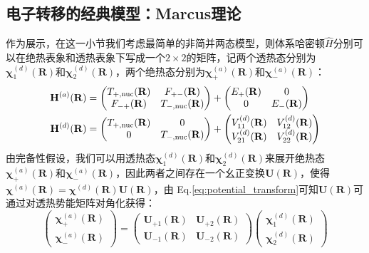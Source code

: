 \subsection{电子转移的经典模型：Marcus理论}
作为展示，在这一小节我们考虑最简单的非简并两态模型，则体系哈密顿$\hat{H}$分别可以在绝热表象和透热表象下写成一个$2 \times 2$的矩阵，记两个透热态分别为$\bm{\chi}^{(d)}_1(\mathbf{R})$和$\bm{\chi}^{(d)}_2(\mathbf{R})$，两个绝热态分别为$\bm{\chi}^{(a)}_+(\mathbf{R})$和$\bm{\chi}^{(a)}_-(\mathbf{R})$：
\[\begin{aligned}
\mathbf{H}^{(a)}(\mathbf{R})&=
\begin{pmatrix}
T_{+,\rm{nuc}}(\mathbf{R}) & F_{+-}(\mathbf{R})\\
F_{-+}(\mathbf{R}) & T_{-,\rm{nuc}}(\mathbf{R})
\end{pmatrix}
+
\begin{pmatrix}
E_+(\mathbf{R}) & 0\\
0 & E_-(\mathbf{R})
\end{pmatrix}\\
\mathbf{H}^{(d)}(\mathbf{R})&=\begin{pmatrix}
T_{+,\rm{nuc}}(\mathbf{R}) & 0\\
0 & T_{-,\rm{nuc}}(\mathbf{R})
\end{pmatrix}
+
\begin{pmatrix}
V_{11}^{(d)}(\mathbf{R}) & V_{12}^{(d)}(\mathbf{R})\\
V_{21}^{(d)}(\mathbf{R}) & V_{22}^{(d)}(\mathbf{R})
\end{pmatrix}
\end{aligned}\]
由完备性假设，我们可以用透热态$\bm{\chi}^{(d)}_1(\mathbf{R})$和$\bm{\chi}^{(d)}_2(\mathbf{R})$来展开绝热态$\bm{\chi}^{(a)}_+(\mathbf{R})$和$\bm{\chi}^{(a)}_-(\mathbf{R})$，因此两者之间存在一个幺正变换$\mathbf{U}(\mathbf{R})$，使得$\bm{\chi}^{(a)}(\mathbf{R})=\bm{\chi}^{(d)}(\mathbf{R})\mathbf{U}(\mathbf{R})$，由 Eq.\eqref{eq:potential_transform}可知$\mathbf{U}(\mathbf{R})$可通过对透热势能矩阵对角化获得：
\[
\begin{pmatrix}
\bm{\chi}^{(a)}_+(\mathbf{R}) \\
\bm{\chi}^{(a)}_-(\mathbf{R})
\end{pmatrix}
=
\begin{pmatrix}
\mathbf{U}_{+1}(\mathbf{R}) & \mathbf{U}_{+2}(\mathbf{R}) \\
\mathbf{U}_{-1}(\mathbf{R}) & \mathbf{U}_{-2}(\mathbf{R})
\end{pmatrix}
\begin{pmatrix}
\bm{\chi}^{(d)}_1(\mathbf{R}) \\
\bm{\chi}^{(d)}_2(\mathbf{R})
\end{pmatrix}
\]
